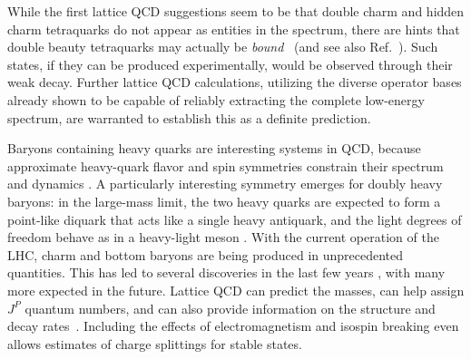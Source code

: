 While the first lattice QCD suggestions seem to be that double charm and hidden charm tetraquarks do not appear as entities in the spectrum, there are hints that double beauty tetraquarks may actually be \emph{bound}~\cite{Francis:2016hui} (and see also Ref.~\cite{Hughes:2017xie}). Such states, if they can be produced experimentally, would be observed through their weak decay. Further lattice QCD calculations, utilizing the diverse operator bases already shown to be capable of  reliably extracting the complete low-energy spectrum, are warranted to establish this as a definite prediction. 

 Baryons containing heavy quarks are interesting systems in QCD, because approximate heavy-quark flavor and spin symmetries
constrain their spectrum and dynamics \cite{Korner:1994nh, Manohar:2000dt}. A particularly interesting symmetry emerges for doubly heavy baryons: in the large-mass limit, the two heavy quarks
are expected to form a point-like diquark that acts like a single heavy antiquark, and the light degrees of freedom behave as in a
heavy-light meson \cite{Savage:1990di, Brambilla:2005yk}. With the current operation of the LHC, charm and bottom baryons are being produced in unprecedented quantities.
This has led to several discoveries in the last few years \cite{Chatrchyan:2012ni, Aaij:2012da, Aaij:2014yka, Aaij:2016jnn, Aaij:2017ueg,  Aaij:2017vbw, Aaij:2017nav}, with many more expected in the future. Lattice QCD
can predict the masses, can help assign $J^P$ quantum numbers, and can also provide information on the structure and decay rates~\cite{Brown:2014ena, Padmanath:2015jea, Bali:2015lka, Alexandrou:2017xwd}. Including the effects of electromagnetism and isospin breaking even allows estimates of charge splittings for stable states\cite{Borsanyi:2014jba}.









